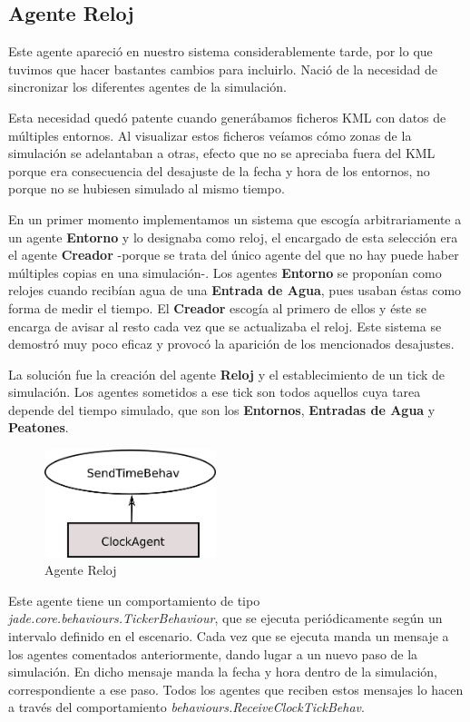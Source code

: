 \subsection*{Agente Reloj}

Este agente apareció en nuestro sistema considerablemente tarde, por lo que
tuvimos que hacer bastantes cambios para incluirlo. Nació de la necesidad de
sincronizar los diferentes agentes de la simulación.

Esta necesidad quedó patente cuando generábamos ficheros KML con datos de
múltiples entornos. Al visualizar estos ficheros veíamos cómo zonas de la
simulación se adelantaban a otras, efecto que no se apreciaba fuera del KML
porque era consecuencia del desajuste de la fecha y hora de los entornos, no
porque no se hubiesen simulado al mismo tiempo.

En un primer momento implementamos un sistema que escogía arbitrariamente a un
agente {\bf Entorno} y lo designaba como reloj, el encargado de esta selección
era el agente {\bf Creador} -porque se trata del único agente del que no hay
puede haber múltiples copias en una simulación-. Los agentes {\bf Entorno} se
proponían como relojes cuando recibían agua de una {\bf Entrada de Agua}, pues
usaban éstas como forma de medir el tiempo. El {\bf Creador} escogía al primero
de ellos y éste se encarga de avisar al resto cada vez que se actualizaba el
reloj. Este sistema se demostró muy poco eficaz y provocó la aparición de los
mencionados desajustes.

La solución fue la creación del agente {\bf Reloj} y el establecimiento de un
tick de simulación. Los agentes sometidos a ese tick son todos aquellos cuya
tarea depende del tiempo simulado, que son los {\bf Entornos}, {\bf Entradas
de Agua} y {\bf Peatones}.

\begin{figure}[H]
 \centering
 \includegraphics[width=50mm]{figuras/cap5/ag_clock.png}
 \caption{Agente Reloj}
\end{figure}

Este agente tiene un comportamiento de tipo {\em
jade.core.behaviours.TickerBehaviour}, que se ejecuta periódicamente según un
intervalo definido en el escenario. Cada vez que se ejecuta manda un mensaje a
los agentes comentados anteriormente, dando lugar a un nuevo paso de la
simulación. En dicho mensaje manda la fecha y hora dentro de la simulación,
correspondiente a ese paso. Todos los agentes que reciben estos mensajes lo
hacen a través del comportamiento {\em behaviours.ReceiveClockTickBehav}.

